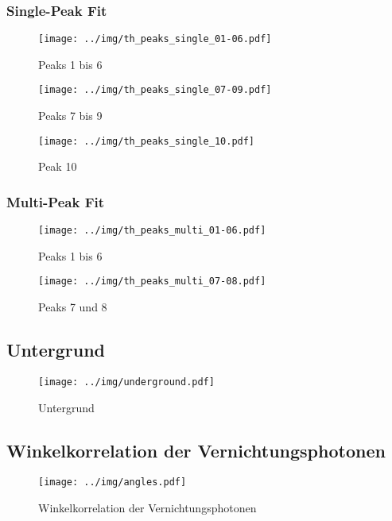 \subsubsection{Single-Peak Fit} %
\begin{figure}[H]
\begin{center}
  \texttt{[image: ../img/th\_peaks\_single\_01-06.pdf]}
  \caption{Peaks 1 bis 6}
  \label{img:th:peaks:single:0106}
\end{center}
\end{figure}

\begin{figure}[H]
\begin{center}
  \texttt{[image: ../img/th\_peaks\_single\_07-09.pdf]}
  \caption{Peaks 7 bis 9}
  \label{img:th:peaks:single:0709}
\end{center}
\end{figure}

\begin{figure}[H]
\begin{center}
  \texttt{[image: ../img/th\_peaks\_single\_10.pdf]}
  \caption{Peak 10}
  \label{img:th:peaks:single:10}
\end{center}
\end{figure}

\subsubsection{Multi-Peak Fit} %
\begin{figure}[H]
\begin{center}
  \texttt{[image: ../img/th\_peaks\_multi\_01-06.pdf]}
  \caption{Peaks 1 bis 6}
  \label{img:th:peaks:multi:0106}
\end{center}
\end{figure}

\begin{figure}[H]
\begin{center}
  \texttt{[image: ../img/th\_peaks\_multi\_07-08.pdf]}
  \caption{Peaks 7 und 8}
  \label{img:th:peaks:multi:0708}
\end{center}
\end{figure}

\subsection{Untergrund}
\begin{figure}[H]
\begin{center}
  \texttt{[image: ../img/underground.pdf]}
  \caption{Untergrund}
  \label{img:underground}
\end{center}
\end{figure}


\subsection{Winkelkorrelation der  Vernichtungsphotonen}
\begin{figure}[H]
\begin{center}
  \texttt{[image: ../img/angles.pdf]}
  \caption{Winkelkorrelation der  Vernichtungsphotonen}
  \label{img:angles}
\end{center}
\end{figure}
